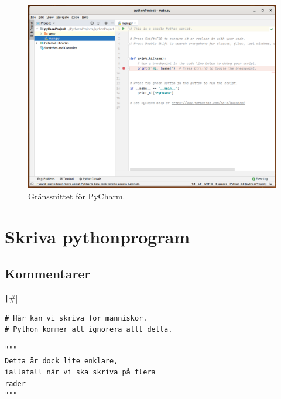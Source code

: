 \begin{frame}
  \begin{figure}
    \centering
    \includegraphics[height=0.8\textheight]{figs/pycharm.png}
    \caption{Gränssnittet för PyCharm.}
  \end{figure}
\end{frame}


\section{Skriva pythonprogram}

\subsection{Kommentarer}

\begin{frame}[fragile]
  \begin{center}
    \texttt|#|
  \end{center}
\end{frame}

\begin{frame}[fragile]
  \begin{example}
    \begin{verbatim}
# Här kan vi skriva for människor.
# Python kommer att ignorera allt detta.
    \end{verbatim}
  \end{example}
\end{frame}

\begin{frame}[fragile]
  \begin{example}
    \begin{verbatim}
"""
Detta är dock lite enklare,
iallafall när vi ska skriva på flera
rader
"""
    \end{verbatim}
  \end{example}
\end{frame}


